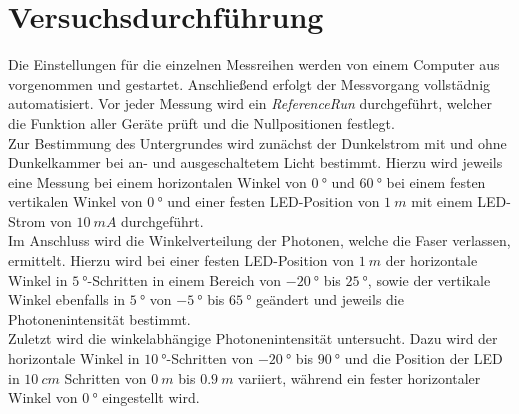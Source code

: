 \section{Versuchsdurchführung}
Die Einstellungen für die einzelnen Messreihen werden von einem Computer aus vorgenommen und gestartet. Anschließend erfolgt der Messvorgang vollstädnig automatisiert. 
Vor jeder Messung wird ein \textit{ReferenceRun} durchgeführt, welcher die Funktion aller Geräte prüft und die Nullpositionen festlegt.\\

Zur Bestimmung des Untergrundes wird zunächst der Dunkelstrom mit und ohne Dunkelkammer bei an- und ausgeschaltetem Licht bestimmt. Hierzu wird jeweils eine Messung bei einem horizontalen Winkel von $\SI{0}{°}$ und $\SI{60}{°}$ bei einem festen vertikalen Winkel von $\SI{0}{°}$ und einer festen LED-Position von $\SI{1}{m}$ mit einem LED-Strom von $\SI{10}{mA}$ durchgeführt.\\

Im Anschluss wird die Winkelverteilung der Photonen, welche die Faser verlassen, ermittelt. Hierzu wird bei einer festen LED-Position von $\SI{1}{m}$ der horizontale Winkel in $\SI{5}{°}$-Schritten in einem Bereich von $\SI{-20}{°}$ bis $\SI{25}{°}$, sowie der vertikale Winkel ebenfalls in $\SI{5}{°}$ von $\SI{-5}{°}$ bis $\SI{65}{°}$ geändert und jeweils die Photonenintensität bestimmt.\\

Zuletzt wird die winkelabhängige Photonenintensität untersucht. Dazu wird der horizontale Winkel in $\SI{10}{°}$-Schritten von $\SI{-20}{°}$ bis $\SI{90}{°}$ und die Position der LED in $\SI{10}{cm}$ Schritten von $\SI{0}{m}$ bis $\SI{0.9}{m}$ variiert, während ein fester horizontaler Winkel von $\SI{0}{°}$ eingestellt wird.